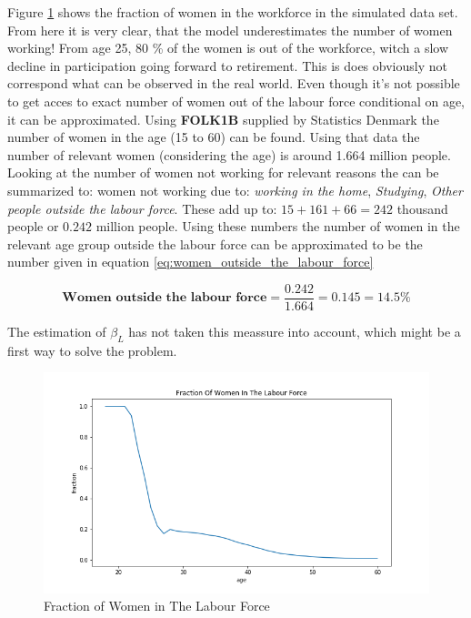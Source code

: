 Figure \ref{fig:dqi_model1_fraction_in_workforce} shows the fraction of women in the workforce in the simulated data set. From here it is very clear, that the model underestimates the number of women working! From age 25, 80 \% of the women is out of the workforce, witch a slow decline in participation going forward to retirement. This is does obviously not correspond what can be observed in the real world. Even though it's not possible to get acces to exact number of women out of the labour force conditional on age, it can be approximated. Using \textbf{FOLK1B} supplied by Statistics Denmark the number of women in the age (15 to 60) can be found. Using that data the number of relevant women (considering the age) is around 1.664 million people. Looking at the number of women not working for relevant reasons the can be summarized to: women not working due to: \textit{working in the home}, \textit{Studying}, \textit{Other people outside the labour force}. These add up to: $15 + 161 + 66 = 242$ thousand people or $0.242$ million people. Using these numbers the number of women in the relevant age group outside the labour force can be approximated to be the number given in equation \ref{eq:women_outside_the_labour_force}

\begin{equation}
    \label{eq:women_outside_the_labour_force}
    \textbf{Women outside the labour force} = \frac{0.242}{1.664} = 0.145 = 14.5 \%
\end{equation}

The estimation of $\beta_L$ has not taken this meassure into account, which might be a first way to solve the problem.

\begin{figure}
    \centering
    \includegraphics[scale=0.4]{figures/dqi_model1_women_in_labour_force_fraction.png}
    \caption{Fraction of Women in The Labour Force}
    \label{fig:dqi_model1_fraction_in_workforce}
\end{figure}

